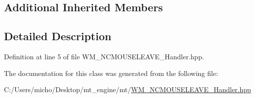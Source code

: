 \subsection*{Additional Inherited Members}


\subsection{Detailed Description}


Definition at line 5 of file W\+M\+\_\+\+N\+C\+M\+O\+U\+S\+E\+L\+E\+A\+V\+E\+\_\+\+Handler.\+hpp.



The documentation for this class was generated from the following file\+:\begin{DoxyCompactItemize}
\item 
C\+:/\+Users/micho/\+Desktop/mt\+\_\+engine/mt/\hyperlink{_w_m___n_c_m_o_u_s_e_l_e_a_v_e___handler_8hpp}{W\+M\+\_\+\+N\+C\+M\+O\+U\+S\+E\+L\+E\+A\+V\+E\+\_\+\+Handler.\+hpp}\end{DoxyCompactItemize}
